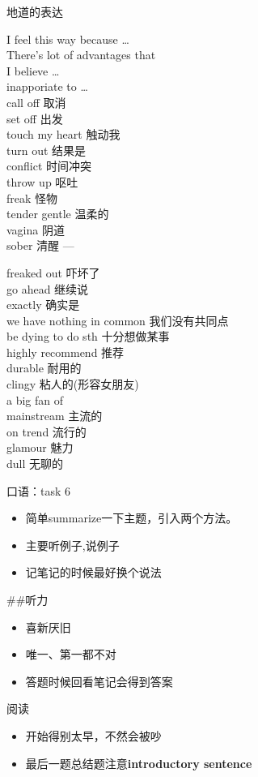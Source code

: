 \documentclass[ignorenonframetext,]{beamer}
\begin{document}
\begin{frame}{地道的表达}
\protect\hypertarget{ux5730ux9053ux7684ux8868ux8fbe}{}

I feel this way because \ldots{}\\
There's lot of advantages that\\
I believe \ldots{}\\
inapporiate to \ldots{}\\
call off 取消\\
set off 出发\\
touch my heart 触动我\\
turn out 结果是\\
conflict 时间冲突\\
throw up 呕吐\\
freak 怪物\\
tender gentle 温柔的\\
vagina 阴道\\
sober 清醒 ---

freaked out 吓坏了\\
go ahead 继续说\\
exactly 确实是\\
we have nothing in common 我们没有共同点\\
be dying to do sth 十分想做某事\\
highly recommend 推荐\\
durable 耐用的\\
clingy 粘人的(形容女朋友)\\
a big fan of\\
mainstream 主流的\\
on trend 流行的\\
glamour 魅力\\
dull 无聊的

\begin{block}{口语：task 6}

\begin{itemize}
\item
  简单summarize一下主题，引入两个方法。
\item
  主要听例子,说例子
\item
  记笔记的时候最好换个说法
\end{itemize}

\#\#听力

\begin{itemize}
\item
  喜新厌旧
\item
  唯一、第一都不对
\item
  答题时候回看笔记会得到答案
\end{itemize}

\end{block}

\end{frame}

\begin{frame}{阅读}
\protect\hypertarget{ux9605ux8bfb}{}

\begin{itemize}
\item
  开始得别太早，不然会被吵
\item
  最后一题总结题注意\textbf{introductory sentence}
\end{itemize}

\end{frame}

\begin{frame}

\end{frame}
\end{document}
